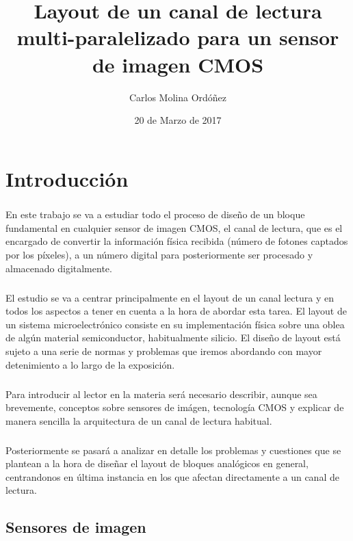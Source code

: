 \documentclass[12pt,a4paper,oneside,titlepage]{report}
\author{Carlos Molina Ordóñez}
\date{20 de Marzo de 2017}
\title{Layout de un canal de lectura multi-paralelizado para un sensor de imagen CMOS}
\begin{document}
\maketitle
\tableofcontents

\chapter{Introducción}

\paragraph{}
En este trabajo se va a estudiar todo el proceso de diseño de un bloque fundamental
en cualquier sensor de imagen CMOS, el canal de lectura, que es el encargado
de convertir la información física recibida (número de fotones captados por los
píxeles), a un número digital para posteriormente ser procesado y almacenado digitalmente.

\paragraph{}
El estudio se va a centrar principalmente en el layout de un canal
lectura y en todos los aspectos a tener en cuenta a la hora de abordar esta tarea.
El layout de un sistema microelectrónico consiste en su implementación física
sobre una oblea de algún material semiconductor, habitualmente silicio. El
diseño de layout está sujeto a una serie de normas y problemas que iremos abordando
con mayor detenimiento a lo largo de la exposición.

\paragraph{}
Para introducir al lector en la materia será necesario describir, aunque sea
brevemente, conceptos sobre sensores de imágen, tecnología CMOS y explicar de manera
sencilla la arquitectura de un canal de lectura habitual.

\paragraph{}
Posteriormente se pasará a analizar en detalle los problemas y cuestiones que se
plantean a la hora de diseñar el layout de bloques analógicos en general,
centrandonos en última instancia en los que afectan directamente a un canal de lectura.

\section{Sensores de imagen}
\end{document}
